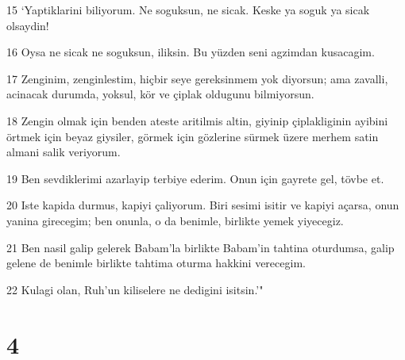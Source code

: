 \par 15 `Yaptiklarini biliyorum. Ne soguksun, ne sicak. Keske ya soguk ya sicak olsaydin!
\par 16 Oysa ne sicak ne soguksun, iliksin. Bu yüzden seni agzimdan kusacagim.
\par 17 Zenginim, zenginlestim, hiçbir seye gereksinmem yok diyorsun; ama zavalli, acinacak durumda, yoksul, kör ve çiplak oldugunu bilmiyorsun.
\par 18 Zengin olmak için benden ateste aritilmis altin, giyinip çiplakliginin ayibini örtmek için beyaz giysiler, görmek için gözlerine sürmek üzere merhem satin almani salik veriyorum.
\par 19 Ben sevdiklerimi azarlayip terbiye ederim. Onun için gayrete gel, tövbe et.
\par 20 Iste kapida durmus, kapiyi çaliyorum. Biri sesimi isitir ve kapiyi açarsa, onun yanina girecegim; ben onunla, o da benimle, birlikte yemek yiyecegiz.
\par 21 Ben nasil galip gelerek Babam'la birlikte Babam'in tahtina oturdumsa, galip gelene de benimle birlikte tahtima oturma hakkini verecegim.
\par 22 Kulagi olan, Ruh'un kiliselere ne dedigini isitsin.'"

\chapter{4}


